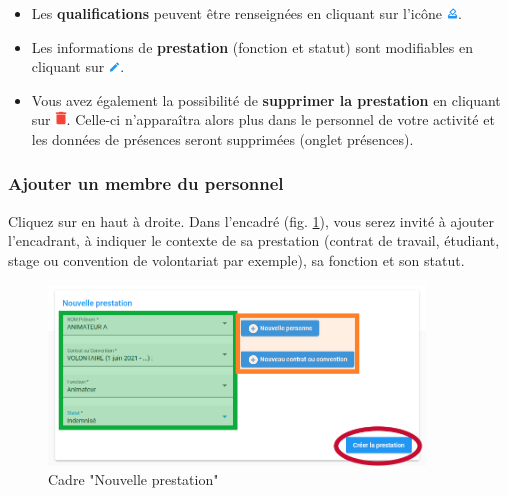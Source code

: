 \begin{itemize}
    \item Les \textbf{qualifications} peuvent être renseignées en cliquant sur l'icône \includegraphics[width=0.3cm]{Images/icon/button_dmd_qualif.png}.
    \item Les informations de \textbf{prestation} (fonction et statut) sont modifiables en cliquant sur \includegraphics[width=0.3cm]{Images/icon/button_modif.png}.
    \item Vous avez également la possibilité de \textbf{supprimer la prestation} en cliquant sur \includegraphics[width=0.3cm]{Images/icon/button_poubelle.png}. Celle-ci n'apparaîtra alors plus dans le personnel de votre activité et les données de présences seront supprimées (onglet présences).
\end{itemize} 





\subsubsection{Ajouter un membre du personnel}
Cliquez sur  en haut à droite. Dans l'encadré  (fig. \ref{fig:pad_new_prestation}), vous serez invité à ajouter l'encadrant, à indiquer le contexte de sa prestation (contrat de travail, étudiant, stage ou convention de volontariat par exemple), sa fonction et son statut. 

\begin{figure}[h]
    \centering
    \includegraphics[width=10cm]{Images/cdv/new_prestation.png}
    \caption{Cadre "Nouvelle prestation"}
    \label{fig:pad_new_prestation}
\end{figure}



